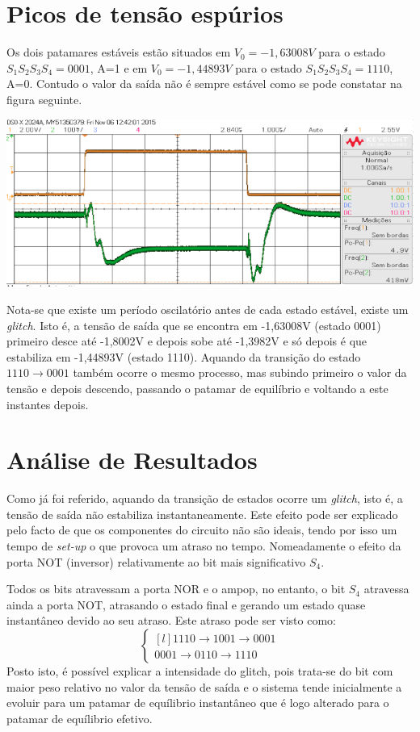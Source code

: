 \documentclass[a4paper,11pt]{report}
\begin{document}
\section{Picos de tensão espúrios}
Os dois patamares estáveis estão situados em $V_0 = -1,63008V$ para o estado $S_1S_2S_3S_4 = 0001$, A=1 e em $V_0 = -1,44893V$ para o estado $S_1S_2S_3S_4 = 1110$, A=0.
Contudo o valor da saída não é sempre estável como se pode constatar na figura seguinte.
\begin{center}
     \includegraphics[angle=0,width=1\textwidth]{7_2_2_Atraso}
     \label{7_2_2}
\end{center}
Nota-se que existe um período oscilatório antes de cada estado estável, existe um \textit{glitch}. Isto é, a tensão de saída que se encontra em -1,63008V (estado 0001) primeiro desce até -1,8002V e depois sobe até -1,3982V e só depois é que estabiliza em -1,44893V (estado 1110). Aquando da transição do estado $1110\rightarrow 0001$ também ocorre o mesmo processo, mas subindo primeiro o valor da tensão e depois descendo, passando o patamar de equilíbrio e voltando a este instantes depois.\par

\section{Análise de Resultados}
Como já foi referido, aquando da transição de estados ocorre um \textit{glitch}, isto é, a tensão de saída não estabiliza instantaneamente. Este efeito pode ser explicado pelo facto de que os componentes do circuito não são ideais, tendo por isso um tempo de \textit{set-up} o que provoca um atraso no tempo. Nomeadamente o efeito da porta NOT (inversor) relativamente ao bit mais significativo $S_4$.\par 
Todos os bits atravessam a porta NOR e o ampop, no entanto, o bit $S_4$ atravessa ainda a porta NOT, atrasando o estado final e gerando um estado quase instantâneo devido ao seu atraso. Este atraso pode ser visto como:
\begin{equation*}
\left\{ \begin{matrix*}[l]
 1110 \rightarrow 1001 \rightarrow 0001\\
 0001 \rightarrow 0110 \rightarrow 1110
\end{matrix*} \right.
\end{equation*}
Posto isto, é possível explicar a intensidade do glitch, pois trata-se do bit com maior peso relativo no valor da tensão de saída e o sistema tende inicialmente a evoluir para um patamar de equílibrio instantâneo que é logo alterado para o patamar de equílibrio efetivo.
\end{document}
